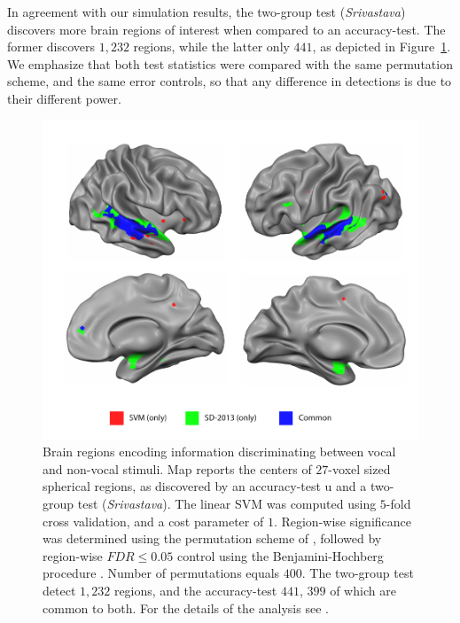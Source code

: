 \documentclass[]{bio}
\begin{document}
In agreement with our simulation results, the two-group test (\emph{Srivastava}) discovers more brain regions of interest when compared to an accuracy-test.
The former discovers $1,232$ regions, while the latter only $441$, as depicted in Figure~\ref{fig:read_data}.
We emphasize that both test statistics were compared with the same permutation scheme, and the same error controls, so that any difference in detections is due to their different power.


\begin{figure}[th]
	\centering
	\includegraphics[width=1\columnwidth]{"art/svm_vs_SD"}
	\caption{\footnotesize
		Brain regions encoding information discriminating between vocal and non-vocal stimuli.
		Map reports the centers of $27$-voxel sized spherical regions, as discovered by an accuracy-test u and a two-group test (\emph{Srivastava}). 
		The linear SVM was computed using $5$-fold cross validation, and a cost parameter of $1$. 
		Region-wise significance was determined using the permutation scheme of \cite{stelzer_statistical_2013}, followed by region-wise $FDR \leq 0.05$ control using the Benjamini-Hochberg procedure \cite{benjamini_controlling_1995}.
		Number of permutations equals $400$.
		The two-group test detect $1,232$ regions, and the accuracy-test $441$, $399$ of which are common to both.
		For the details of the analysis see \cite{gilron_quantifying_2016}.  
	}
	\label{fig:read_data}
\end{figure}
\end{document}
